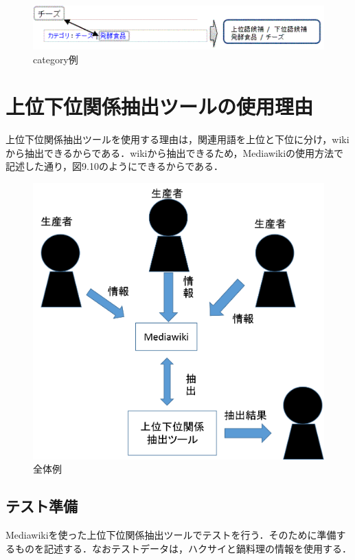 \clearpage

\begin{figure}[hb]
\centering
\includegraphics[width=13cm]{category}
\caption{category例}\label{category}
\end{figure}

\section{上位下位関係抽出ツールの使用理由}
上位下位関係抽出ツールを使用する理由は，関連用語を上位と下位に分け，wikiから抽出できるからである．wikiから抽出できるため，Mediawikiの使用方法で記述した通り，図9.10のようにできるからである．

\begin{figure}[hb]
\centering
\includegraphics[width=13cm]{zyouikai.png}
\caption{全体例}\label{zyouikai.png}
\end{figure}


\subsection{テスト準備}
Mediawikiを使った上位下位関係抽出ツールでテストを行う．そのために準備するものを記述する．なおテストデータは，ハクサイと鍋料理の情報を使用する．

